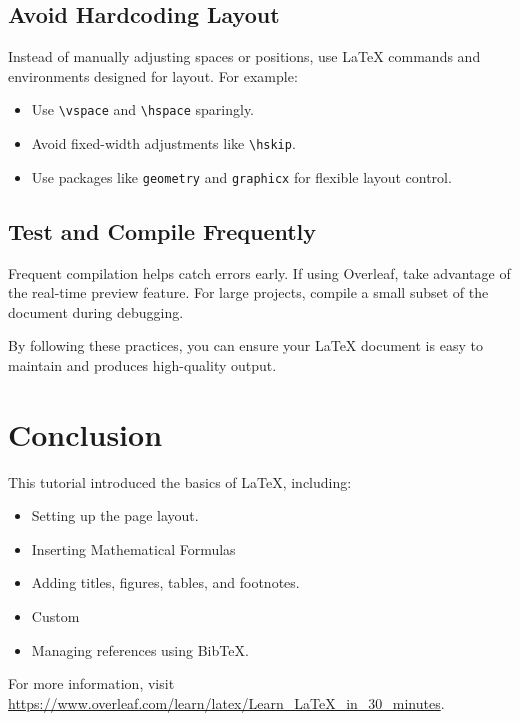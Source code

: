 \documentclass[12pt]{article}
\begin{document}
\subsection*{Avoid Hardcoding Layout}
Instead of manually adjusting spaces or positions, use LaTeX commands and environments designed for layout. For example:
\begin{itemize}
    \item Use \texttt{\textbackslash vspace} and \texttt{\textbackslash hspace} sparingly.
    \item Avoid fixed-width adjustments like \texttt{\textbackslash hskip}.
    \item Use packages like \texttt{geometry} and \texttt{graphicx} for flexible layout control.
\end{itemize}

\subsection*{Test and Compile Frequently}
Frequent compilation helps catch errors early. If using Overleaf, take advantage of the real-time preview feature. For large projects, compile a small subset of the document during debugging.

By following these practices, you can ensure your LaTeX document is easy to maintain and produces high-quality output.

\section{Conclusion}
This tutorial introduced the basics of LaTeX, including:
\begin{itemize}
    \item Setting up the page layout.
    \item Inserting Mathematical Formulas
    \item Adding titles, figures, tables, and footnotes.
    \item Custom
    \item Managing references using BibTeX.
\end{itemize}

For more information, visit \url{https://www.overleaf.com/learn/latex/Learn_LaTeX_in_30_minutes}.



\end{document}
